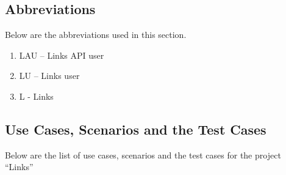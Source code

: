\documentclass[11pt]{report} %
\begin{document}
\subsection*{Abbreviations}
Below are the abbreviations used in this section.
\begin{enumerate}
	\item
		LAU – Links API user
	\item
		LU – Links user
	\item
		L - Links
\end{enumerate}

\subsection*{Use Cases, Scenarios and the Test Cases}
Below are the list of use cases, scenarios and the test cases for the project ``Links''
\end{document}
